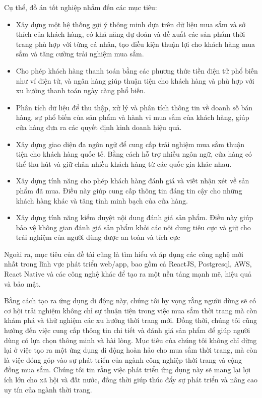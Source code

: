 Cụ thể, đồ án tốt nghiệp nhắm đến các mục tiêu:
\begin{itemize}
\item{Xây dựng một hệ thống gợi ý thông minh dựa trên dữ liệu mua sắm và sở thích của khách hàng, có khả năng dự đoán và đề xuất các sản phẩm thời trang phù hợp với từng cá nhân, tạo điều kiện thuận lợi cho khách hàng mua sắm và tăng cường trải nghiệm mua sắm.}
\item{Cho phép khách hàng thanh toán bằng các phương thức tiền điện tử phổ biến như ví điện tử, và ngân hàng giúp thuận tiện cho khách hàng và phù hợp với xu hướng thanh toán ngày càng phổ biến.}
\item{Phân tích dữ liệu để thu thập, xử lý và phân tích thông tin về doanh số bán hàng, sự phổ biến của sản phẩm và hành vi mua sắm của khách hàng, giúp cửa hàng đưa ra các quyết định kinh doanh hiệu quả.}

\item{Xây dựng giao diện đa ngôn ngữ để cung cấp trải nghiệm mua sắm thuận tiện cho khách hàng quốc tế. Bằng cách hỗ trợ nhiều ngôn ngữ, cửa hàng có thể thu hút và giữ chân nhiều khách hàng từ các quốc gia khác nhau.}

\item{Xây dựng tính năng cho phép khách hàng đánh giá và viết nhận xét về sản phẩm đã mua. Điều này giúp cung cấp thông tin đáng tin cậy cho những khách hàng khác và tăng tính minh bạch của cửa hàng.}

\item{Xây dựng tính năng kiểm duyệt nội dung đánh giá sản phẩm. Điều này giúp bảo vệ không gian đánh giá sản phẩm khỏi các nội dung tiêu cực và giữ cho trải nghiệm của người dùng được an toàn và tích cực}

\end{itemize}

Ngoài ra, mục tiêu của đề tài cũng là tìm hiểu và áp dụng các công nghệ mới nhất trong lĩnh vực phát triển web/app, bao gồm cả ReactJS, Postgresql, AWS, React Native và các công nghệ khác để tạo ra một nền tảng mạnh mẽ, hiệu quả và bảo mật.

Bằng cách tạo ra ứng dụng di động này, chúng tôi hy vọng rằng người dùng sẽ có cơ hội trải nghiệm không chỉ sự thuận tiện trong việc mua sắm thời trang mà còn khám phá và thử nghiệm các xu hướng thời trang mới. Đồng thời, chúng tôi cũng hướng đến việc cung cấp thông tin chi tiết và đánh giá sản phẩm để giúp người dùng có lựa chọn thông minh và hài lòng. Mục tiêu của chúng tôi không chỉ dừng lại ở việc tạo ra một ứng dụng di động hoàn hảo cho mua sắm thời trang, mà còn là việc đóng góp vào sự phát triển của ngành công nghiệp thời trang và cộng đồng mua sắm. Chúng tôi tin rằng việc phát triển ứng dụng này sẽ mang lại lợi ích lớn cho xã hội và đất nước, đồng thời giúp thúc đẩy sự phát triển và nâng cao uy tín của ngành thời trang.
